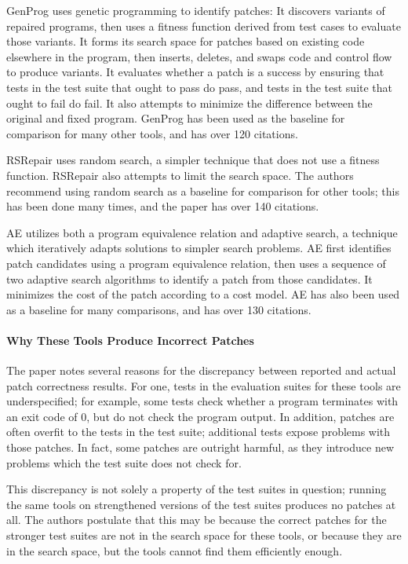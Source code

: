 GenProg uses genetic programming to identify patches: It discovers variants of repaired programs, then uses a fitness function derived from test cases
to evaluate those variants. It forms its search space for patches based on existing code elsewhere in the program,
then inserts, deletes, and swaps code and control flow to produce variants. It evaluates whether a patch is
a success by ensuring that tests in the test suite that ought to pass do pass, and tests in the test suite that ought to fail do fail.
It also attempts to minimize the difference between the original and fixed program.
GenProg has been used as the baseline for comparison for many other tools, and has over 120 citations.

RSRepair uses random search, a simpler technique that does not use a fitness function. %
RSRepair also attempts to limit the search space.
The authors recommend using random search as a baseline for comparison for other tools;
this has been done many times, and the paper has over 140 citations.

AE utilizes both a program equivalence relation and %
adaptive search, a technique which iteratively adapts solutions to simpler search problems.
AE first identifies patch candidates using a program equivalence relation, then uses a sequence of 
two adaptive search algorithms to identify a patch from those candidates.
It minimizes the cost of the patch according to a cost model.
AE has also been used as a baseline for many comparisons, and has over 130 citations.

\paragraph{Why These Tools Produce Incorrect Patches}
The paper notes several reasons for the discrepancy 
between reported and actual patch correctness results. For one, tests in the evaluation suites for these tools
are underspecified; for example, some tests check whether
a program terminates with an exit code of 0, but do not check the program output.
In addition, patches are often overfit to the tests in the test suite; additional tests expose problems with those patches.
In fact, some patches are outright harmful, as they introduce new problems which the test suite
does not check for.

This discrepancy is not solely a property of the test suites in question;
running the same tools on strengthened versions of the test suites produces no patches at all.
The authors postulate that this may be because the correct patches for the stronger test suites are not in the
search space for these tools, or because they are in the search space, but the tools
cannot find them efficiently enough. 


